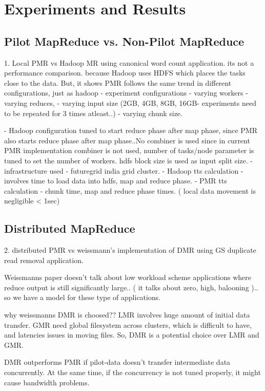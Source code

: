 \documentclass{acm_proc_article-sp}
\begin{document}
\section{Experiments and Results}


\subsection{Pilot MapReduce vs. Non-Pilot MapReduce}
1. Local PMR vs Hadoop MR using canonical word count application.
 its not a performance comparison. because Hadoop uses HDFS which places the tasks close to the data. But, it shows PMR follows the same trend in different configurations, just as hadoop
     - experiment configurations
         - varying workers
         - varying reduces,
         - varying input size (2GB, 4GB, 8GB, 16GB- experiments need to be repeated for 3 times atleast..)
         - varying chunk size.

     - Hadoop configuration tuned to start reduce phase after map phase, since PMR also starts reduce phase after map phase..No combiner is used since in current PMR implementation combiner is not used, number of tasks/node parameter is tuned to set the number of workers. hdfs block size is used as input split size. 
     - infrastructure used - futuregrid india grid cluster.
     - Hadoop tts calculation -involves time to load data into hdfs, map and reduce phase.
     - PMR tts calculation - chunk time, map and reduce phase times. ( local data movement is negligible < 1sec)

\subsection{Distributed MapReduce}

2. distributed PMR vs weissmann's implementation of  DMR using GS duplicate read removal application.

Weissmanns paper doesn't talk about low workload scheme applications where reduce output is still significantly large.. ( it talks about zero, high, balooning ).. so we have a model for these type of applications.

why weissmanns DMR is choosed?? LMR involves huge amount of initial data transfer. GMR need global filesystem across clusters, which is difficult to have, and latencies issues in moving files. So, DMR is a potential choice over LMR and GMR. 

DMR outperforms PMR if pilot-data doesn't transfer intermediate data concurrently. At the same time, if the concurrency  is not tuned properly, it might cause bandwidth problems.
\end{document}
